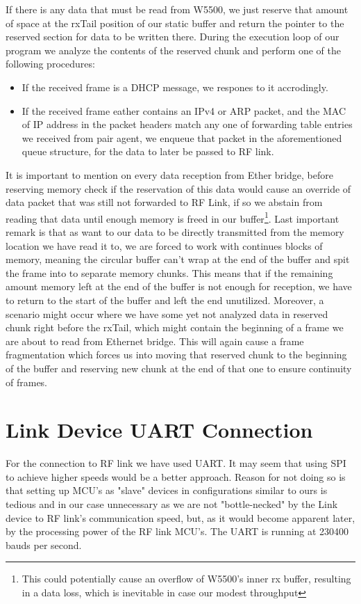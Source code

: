 If there is any data that must be read from W5500, we just reserve that amount of space at the rxTail position of our static buffer and return the pointer to the reserved section for data to be written there. During the execution loop of our program we analyze the contents of the reserved chunk and perform one of the following procedures: 
\begin{itemize}[nolistsep]
    \item If the received frame is a DHCP message, we respones to it accrodingly.
    \item If the received frame eather contains an IPv4 or ARP packet, and the MAC of IP address in the packet headers match any one of forwarding table entries we received from pair agent, we enqueue that packet in the aforementioned queue structure, for the data to later be passed to RF link.
\end{itemize}
It is important to mention on every data reception from Ether bridge, before reserving memory check if the reservation of this data would cause an override of data packet that was still not forwarded to RF Link, if so we abstain from reading that data until enough memory is freed in our buffer\footnote{This could potentially cause an overflow of W5500's inner rx buffer, resulting in a data loss, which is inevitable in case our modest throughput}. Last important remark is that as want to our data to be directly transmitted from the memory location we have read it to, we are forced to work with continues blocks of memory, meaning the circular buffer can't wrap at the end of the buffer and spit the frame into to separate memory chunks. This means that if the remaining amount memory left at the end of the buffer is not enough for reception, we have to return to the start of the buffer and left the end unutilized. Moreover, a scenario might occur where we have some yet not analyzed data in reserved chunk right before the rxTail, which might contain the beginning of a frame we are about to read from Ethernet bridge. This will again cause a frame fragmentation which forces us into moving that reserved chunk to the beginning of the buffer and reserving new chunk at the end of that one to ensure continuity of frames.

\section{Link Device UART Connection}

For the connection to RF link we have used UART. It may seem that using SPI to achieve higher speeds would be a better approach. Reason for not doing so is that setting up MCU's as "slave" devices in configurations similar to ours is tedious and in our case unnecessary as we are not "bottle-necked" by the Link device to RF link's  communication speed, but, as it would become apparent later, by the processing power of the RF link MCU's. The UART is running at 230400 bauds per second.

